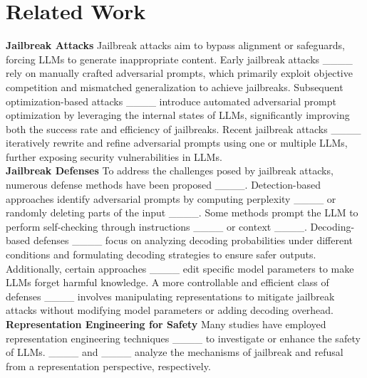 \section{Related Work}
\textbf{Jailbreak Attacks}\quad
Jailbreak attacks aim to bypass alignment or safeguards, forcing LLMs to generate inappropriate content. Early jailbreak attacks ____ rely on manually crafted adversarial prompts, which primarily exploit objective competition and mismatched generalization to achieve jailbreaks. Subsequent optimization-based attacks ____ introduce automated adversarial prompt optimization by leveraging the internal states of LLMs, significantly improving both the success rate and efficiency of jailbreaks. Recent jailbreak attacks ____ iteratively rewrite and refine adversarial prompts using one or multiple LLMs, further exposing security vulnerabilities in LLMs.
\vspace{0.2\baselineskip}
\\ \textbf{Jailbreak Defenses}\quad 
To address the challenges posed by jailbreak attacks, numerous defense methods have been proposed ____. Detection-based approaches identify adversarial prompts by computing perplexity ____ or randomly deleting parts of the input ____. Some methods prompt the LLM to perform self-checking through instructions ____ or context ____. Decoding-based defenses ____ focus on analyzing decoding probabilities under different conditions and formulating decoding strategies to ensure safer outputs. Additionally, certain approaches ____ edit specific model parameters to make LLMs forget harmful knowledge. A more controllable and efficient class of defenses ____ involves manipulating representations to mitigate jailbreak attacks without modifying model parameters or adding decoding overhead. 
\vspace{0.2\baselineskip}
\\ \textbf{Representation Engineering for Safety}\quad     %
Many studies have employed representation engineering techniques ____ to investigate or enhance the safety of LLMs. ____ and ____ analyze the mechanisms of jailbreak and refusal from a representation perspective, respectively. 
